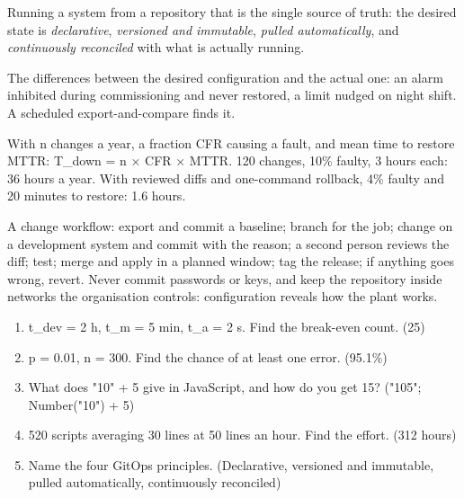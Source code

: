  Running a system from a repository that is the single source of truth: the desired state is \emph{declarative}, \emph{versioned and immutable}, \emph{pulled automatically}, and \emph{continuously reconciled} with what is actually running.

 The differences between the desired configuration and the actual one: an alarm inhibited during commissioning and never restored, a limit nudged on night shift. A scheduled export-and-compare finds it.

 With n changes a year, a fraction CFR causing a fault, and mean time to restore MTTR: T\_down = n × CFR × MTTR. 120 changes, 10\% faulty, 3 hours each: 36 hours a year. With reviewed diffs and one-command rollback, 4\% faulty and 20 minutes to restore: 1.6 hours.

A change workflow: export and commit a baseline; branch for the job; change on a development system and commit with the reason; a second person reviews the diff; test; merge and apply in a planned window; tag the release; if anything goes wrong, revert. Never commit passwords or keys, and keep the repository inside networks the organisation controls: configuration reveals how the plant works.

\begin{enumerate}
\item t\_dev = 2 h, t\_m = 5 min, t\_a = 2 s. Find the break-even count. (25)
\item p = 0.01, n = 300. Find the chance of at least one error. (95.1\%)
\item What does "10" + 5 give in JavaScript, and how do you get 15? ("105"; Number("10") + 5)
\item 520 scripts averaging 30 lines at 50 lines an hour. Find the effort. (312 hours)
\item Name the four GitOps principles. (Declarative, versioned and immutable, pulled automatically, continuously reconciled)
\end{enumerate}
